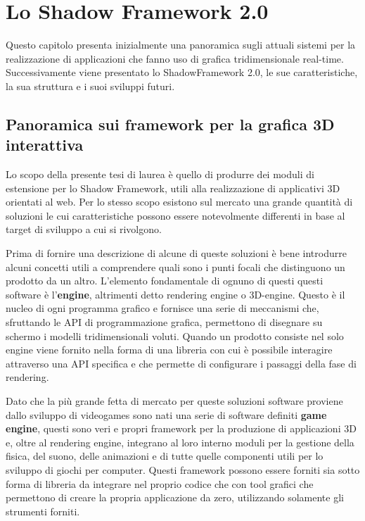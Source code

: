 
\chapter{Lo Shadow Framework 2.0}
\label{ch:shadowframework}
Questo capitolo presenta inizialmente una panoramica sugli attuali sistemi per la realizzazione di applicazioni che fanno uso di grafica tridimensionale real-time. Successivamente viene presentato lo ShadowFramework 2.0, le sue caratteristiche, la sua struttura e i suoi sviluppi futuri.

\section{Panoramica sui framework per la grafica 3D interattiva}
\label{sec:panoramicastrumenti}
Lo scopo della presente tesi di laurea \`e quello di produrre dei moduli di estensione per lo Shadow Framework, utili alla realizzazione di applicativi 3D orientati al web. 
Per lo stesso scopo esistono sul mercato una grande quantit\`a di soluzioni le cui caratteristiche possono essere notevolmente differenti in base al target di sviluppo a cui si rivolgono.

Prima di fornire una descrizione di alcune di queste soluzioni \`e bene introdurre alcuni concetti utili a comprendere quali sono i punti focali che distinguono un prodotto da un altro. L'elemento fondamentale di ognuno di questi questi software \`e l'\textbf{engine}, altrimenti detto rendering engine o 3D-engine. Questo \`e il nucleo di ogni programma grafico e fornisce una serie di meccanismi che, sfruttando le \ac{API} di programmazione grafica, permettono di disegnare su schermo i modelli tridimensionali voluti. Quando un prodotto consiste nel solo engine viene fornito nella forma di una libreria con cui \`e possibile interagire attraverso una \ac{API} specifica e che permette di configurare i passaggi della fase di rendering.

Dato che la pi\`u grande fetta di mercato per queste soluzioni software proviene dallo sviluppo di videogames sono nati una serie di software definiti \textbf{game engine}, questi sono veri e propri framework per la produzione di applicazioni 3D e, oltre al rendering engine, integrano al loro interno moduli per la gestione della fisica, del suono, delle animazioni e di tutte quelle componenti utili per lo sviluppo di giochi per computer. Questi framework possono essere forniti sia sotto forma di libreria da integrare nel proprio codice che con tool grafici che permettono di creare la propria applicazione da zero, utilizzando solamente gli strumenti forniti.

